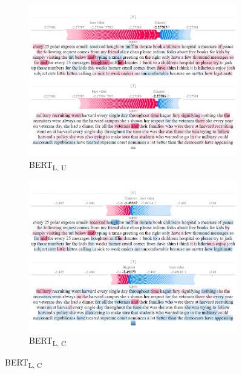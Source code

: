 \begin{figure}[!ht]

    \begin{subfigure}[t]{0.4\textwidth}
        \includegraphics[width=\textwidth]{figs/one_TF/bert-l-u.png}
        \caption{{BERT}\textsubscript{L, U}}
    \end{subfigure}
    \hspace{\fill} %
    \begin{subfigure}[t]{0.4\textwidth}
        \includegraphics[width=\linewidth]{figs/one_TF/bert-l-c.png}
        \caption{{BERT}\textsubscript{L, C}}
    \end{subfigure}



\end{figure}

